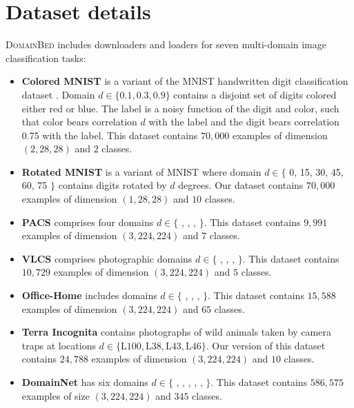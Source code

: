 \documentclass{article}
\newcommand{\domainbed}{\textsc{DomainBed}\xspace}
\begin{document}
\clearpage
\newpage

\section{Dataset details}
\label{sec:dataset_details}

\domainbed includes downloaders and loaders for seven multi-domain image classification tasks: 

\begin{itemize}
    \item \textbf{Colored MNIST} \citep{arjovsky2019invariant} is a variant of the MNIST handwritten digit classification dataset \citep{lecun1998mnist}. Domain $d \in \{0.1, 0.3, 0.9\}$ contains a disjoint set of digits colored either red or blue. The label is a noisy function of the digit and color, such that color bears correlation $d$ with the label and the digit bears correlation 0.75 with the label. This dataset contains $70,000$ examples of dimension $(2, 28, 28)$ and $2$ classes.
\item \textbf{Rotated MNIST} \citep{ghifary2015domain} is a variant of MNIST where domain $d \in \{$ 0, 15, 30, 45, 60, 75 $\}$ contains digits rotated by $d$ degrees. Our dataset contains $70,000$ examples of dimension $(1, 28, 28)$ and $10$ classes.
\item \textbf{PACS} \citep{Li_2017_ICCV} comprises four domains $d \in \{$ , , ,  $\}$. This dataset contains $9,991$ examples of dimension $(3, 224, 224)$ and $7$ classes.
\item \textbf{VLCS} \citep{fang2013unbiased} comprises photographic domains $d \in \{$ , , ,  $\}$. This dataset contains $10,729$ examples of dimension $(3, 224, 224)$ and $5$ classes.
\item \textbf{Office-Home} \citep{venkateswara2017Deep} includes domains $d \in \{$ , , ,  $\}$. This dataset contains $15,588$ examples of dimension $(3, 224, 224)$ and $65$ classes.
\item \textbf{Terra Incognita} \citep{beery2018recognition} contains photographs of wild animals taken by camera traps at locations $d \in \{ \text{L100}, \text{L38}, \text{L43}, \text{L46}\}$. Our version of this dataset contains $24,788$ examples of dimension $(3, 224, 224)$ and $10$ classes.
\item \textbf{DomainNet} \citep{peng2019moment} has six domains $d \in \{$ , , , , ,  $\}$. This dataset contains $586,575$ examples of size $(3, 224, 224)$ and $345$ classes.
\end{itemize}
\end{document}
